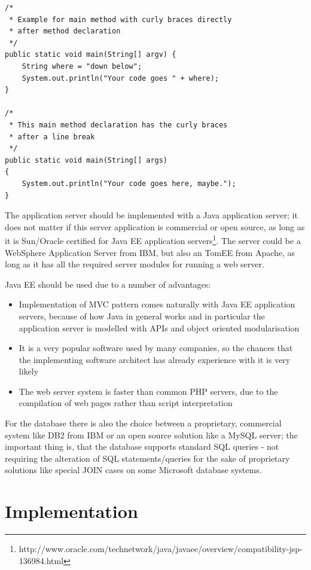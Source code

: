 \documentclass[11pt,a4paper,oneside,svgnames]{report}
\begin{document}
\begin{lstlisting}[caption={Example of method declaration with curly braces in single and new line},label=javaCodeExampleCurlyBraces]
/*
 * Example for main method with curly braces directly 
 * after method declaration
 */
public static void main(String[] argv) {
	String where = "down below";
	System.out.println("Your code goes " + where);
}

/*
 * This main method declaration has the curly braces 
 * after a line break
 */
public static void main(String[] args)
{
	System.out.println("Your code goes here, maybe.");
}
\end{lstlisting}

The application server should be implemented with a Java application server; it does not matter if this server application is commercial or open source, as long as it is Sun/Oracle certified for Java EE application servers\footnote{http://www.oracle.com/technetwork/java/javaee/overview/compatibility-jsp-136984.html}.
The server could be a WebSphere Application Server from IBM, but also an TomEE from Apache, as long as it has all the required server modules for running a web server.

Java EE should be used due to a number of advantages:
\begin{itemize}
	\item Implementation of MVC pattern comes naturally with Java EE application servers, because of how Java in general works and in particular the application server is modelled with APIs and object oriented modularisation
	\item It is a very popular software used by many companies, so the chances that the implementing software architect has already experience with it is very likely
	\item The web server system is faster than common PHP servers, due to the compilation of web pages rather than script interpretation
\end{itemize}

For the database there is also the choice between a proprietary, commercial system like DB2 from IBM or an open source solution like a MySQL server; the important thing is, that the database supports standard SQL queries - not requiring the alteration of SQL statements/queries for the sake of proprietary solutions like special JOIN cases on some Microsoft database systems.

\section{Implementation}
\end{document}
